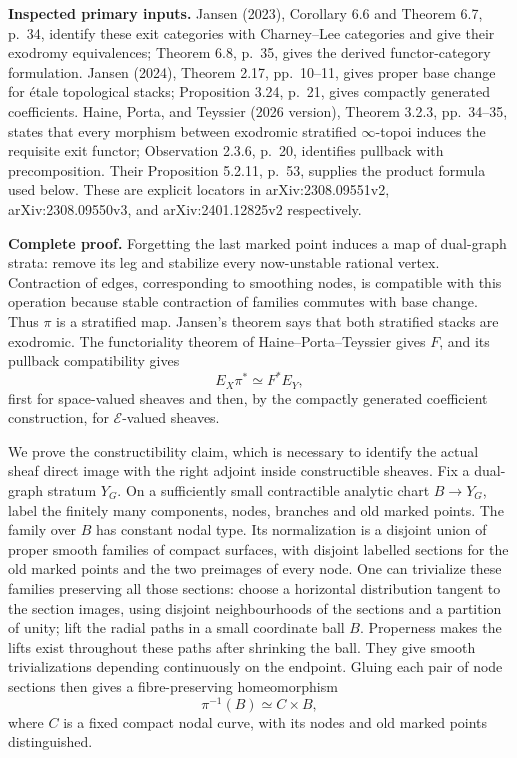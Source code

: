 \textbf{Inspected primary inputs.} Jansen (2023), Corollary 6.6 and
Theorem 6.7, p.~34, identify these exit categories with Charney--Lee
categories and give their exodromy equivalences; Theorem 6.8, p.~35,
gives the derived functor-category formulation. Jansen (2024), Theorem
2.17, pp.~10--11, gives proper base change for étale topological stacks;
Proposition 3.24, p.~21, gives compactly generated coefficients. Haine,
Porta, and Teyssier (2026 version), Theorem 3.2.3, pp.~34--35, states
that every morphism between exodromic stratified \(\infty\)-topoi
induces the requisite exit functor; Observation 2.3.6, p.~20, identifies
pullback with precomposition. Their Proposition 5.2.11, p.~53, supplies
the product formula used below. These are explicit locators in
arXiv:2308.09551v2, arXiv:2308.09550v3, and arXiv:2401.12825v2
respectively.

\textbf{Complete proof.} Forgetting the last marked point induces a map
of dual-graph strata: remove its leg and stabilize every now-unstable
rational vertex. Contraction of edges, corresponding to smoothing nodes,
is compatible with this operation because stable contraction of families
commutes with base change. Thus \(\pi\) is a stratified map. Jansen's
theorem says that both stratified stacks are exodromic. The
functoriality theorem of Haine--Porta--Teyssier gives \(F\), and its
pullback compatibility gives \[
E_X\pi^*\simeq F^*E_Y,
\] first for space-valued sheaves and then, by the compactly generated
coefficient construction, for \(\mathcal E\)-valued sheaves.

We prove the constructibility claim, which is necessary to identify the
actual sheaf direct image with the right adjoint inside constructible
sheaves. Fix a dual-graph stratum \(Y_G\). On a sufficiently small
contractible analytic chart \(B\to Y_G\), label the finitely many
components, nodes, branches and old marked points. The family over \(B\)
has constant nodal type. Its normalization is a disjoint union of proper
smooth families of compact surfaces, with disjoint labelled sections for
the old marked points and the two preimages of every node. One can
trivialize these families preserving all those sections: choose a
horizontal distribution tangent to the section images, using disjoint
neighbourhoods of the sections and a partition of unity; lift the radial
paths in a small coordinate ball \(B\). Properness makes the lifts exist
throughout these paths after shrinking the ball. They give smooth
trivializations depending continuously on the endpoint. Gluing each pair
of node sections then gives a fibre-preserving homeomorphism \[
\pi^{-1}(B)\simeq C\times B,
\tag{CC-RES.3}
\] where \(C\) is a fixed compact nodal curve, with its nodes and old
marked points distinguished.

